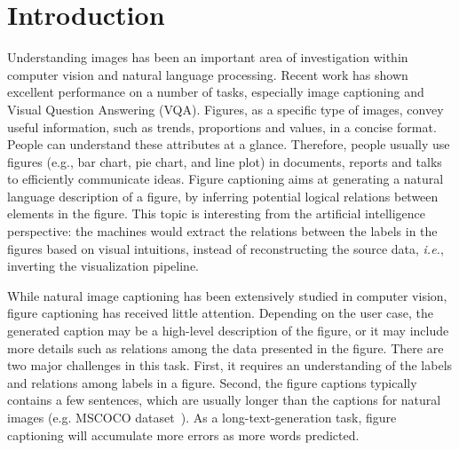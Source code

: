 \documentclass[11pt,a4paper]{article}
\begin{document}
\section{Introduction}
Understanding images has been an important area of investigation within computer vision and natural language processing. Recent work has shown excellent performance on a number of tasks, especially image captioning and Visual Question Answering (VQA).
Figures, as a specific type of images, convey useful information, such as trends, proportions and values, in a concise format. People can understand these attributes at a glance. Therefore, people usually use figures (e.g., bar chart, pie chart, and line plot) in documents, reports and talks to efficiently communicate ideas.
%
Figure captioning aims at generating a natural language description of a figure, by inferring potential logical relations between elements in the figure. 
This topic is interesting from the artificial intelligence perspective: the machines would extract the relations between the labels in the figures based on visual intuitions, instead of reconstructing the source data, \emph{i.e.}, inverting the visualization pipeline. 

While natural image captioning has been extensively studied in computer vision, figure captioning has received little attention. Depending on the user case, the generated caption may be a high-level description of the figure, or it may include more details such as relations among the data presented in the figure. 
There are two major challenges in this task. First, it requires an understanding of the labels and relations among labels in a figure. Second, the figure captions typically contains a few sentences, which are usually longer than the captions for natural images (e.g. MSCOCO dataset~\cite{lin2014microsoft}).  As a long-text-generation task, figure captioning will accumulate more errors as more words predicted.

\end{document}
